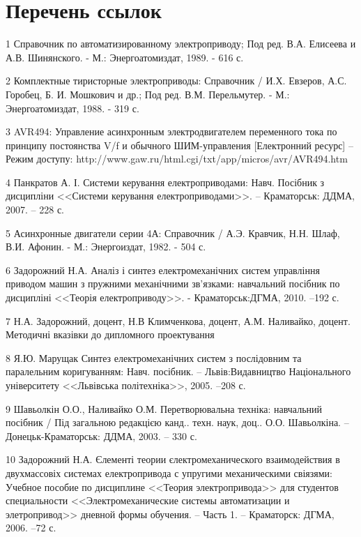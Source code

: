 \section*{Перечень ссылок}
        1	Справочник по автоматизированному электроприводу; Под ред. В.А.
        Елисеева и А.В. Шинянского. - М.: Энергоатомиздат, 1989. - 616 с.

        2	Комплектные тиристорные электроприводы: Справочник / И.Х. Евзеров,
        А.С. Горобец, Б. И. Мошкович и др.; Под ред. В.М. Перельмутер. - М.:
        Энергоатомиздат, 1988. - 319 с.

        3	AVR494: Управление асинхронным электродвигателем переменного тока
        по принципу постоянства V/f и обычного ШИМ-управления [Електронний
        ресурс] – Режим доступу:
        http://www.gaw.ru/html.cgi/txt/app/micros/avr/AVR494.htm

        4	Панкратов А. І. Системи керування електроприводами: Навч. Посібник
        з дисципліни <<Системи керування електроприводами>>. – Краматорськ: ДДМА,
        2007. – 228 с.

        5	Асинхронные двигатели серии 4А: Справочник / А.Э. Кравчик, Н.Н.
        Шлаф, В.И. Афонин. - М.: Энергоиздат, 1982. - 504 с.

        6	Задорожний Н.А. Аналіз і синтез електромеханічних систем управління
        приводом машин з пружними механічними зв'язками: навчальний посібник по
        дисципліні <<Теорія електроприводу>>. - Краматорськ:ДГМА, 2010. –192 с.

        7	Н.А. Задорожний, доцент, Н.В Климченкова, доцент, А.М. Наливайко,
        доцент. Методичні вказівки до дипломного проектування

        8	Я.Ю. Марущак Синтез електромеханічних систем з послідовним та
        паралельним коригуванням: Навч. посібник. – Львів:Видавництво
        Національного університету <<Львівська політехніка>>, 2005. –208 с.

        9	Шавьолкін О.О., Наливайко О.М. Перетворювальна техніка: навчальний
        посібник / Під загальною редакцією канд.. техн. наук,  доц.. О.О.
        Шавьолкіна. – Донецьк-Краматорськ: ДДМА, 2003. – 330 с.

        10	Задорожний Н.А. Єлементі теории єлектромеханического взаимодействия
        в двухмассовіх системах електропривода с упругими механическими
        свіязями: Учебное пособие по дисциплине <<Теория электропривода>> для
        студентов специальности <<Электромеханические системы автоматизации и
        элетропривод>> дневной формы обучения. – Часть 1. – Краматорск: ДГМА,
        2006. –72 с.

